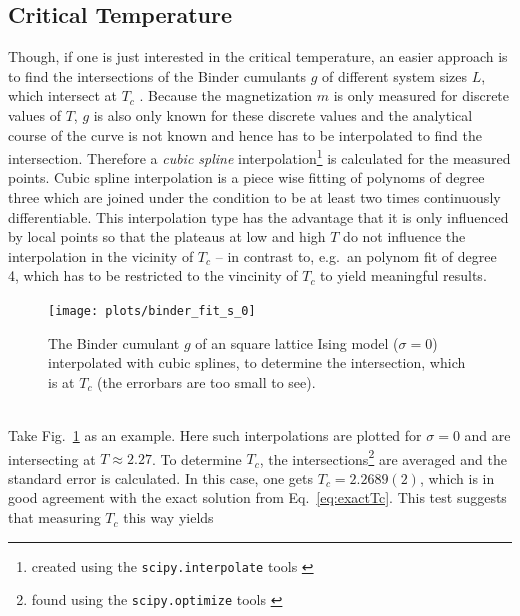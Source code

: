 \subsection{Critical Temperature}
\label{ssec:binderIntersections}
    Though, if one is just interested in the critical temperature, an
    easier approach is to find the intersections of the Binder cumulants
    \(g\) of different system sizes \(L\), which intersect at \(T_c\) \cite{Binder1981}.
    Because the magnetization \(m\) is only measured for discrete values
    of \(T\), \(g\) is also only known for these discrete values and the
    analytical course of the curve is not known and hence has
    to be interpolated to find the intersection. Therefore a \emph{cubic spline}
    interpolation\footnote{created using the \texttt{scipy.interpolate} tools \cite{scipy2001}}
    is calculated for the measured points.
    Cubic spline interpolation is a piece wise fitting of polynoms of
    degree three which are joined under the condition to be at least two
    times continuously differentiable. This interpolation type has the
    advantage that it is only influenced by local points so that the
    plateaus at low and high \(T\) do not influence the interpolation in
    the vicinity of \(T_c\) -- in contrast to, e.g.\ an polynom fit of
    degree 4, which has to be restricted to the vincinity of \(T_c\) to
    yield meaningful results.
    \begin{figure}[htbp]
        \centering
        \texttt{[image: plots/binder\_fit\_s\_0]}
        \caption[Example of a Binder Cumulant to Determine the Critical Temperature]
        {
            The Binder cumulant \(g\) of an square lattice Ising model
            (\(\sigma=0\)) interpolated with cubic splines, to determine
            the intersection, which is at \(T_c\)
            (the errorbars are too small to see).\\
        }
        \label{fig:gettingCrit:binder_fit_s_0}
    \end{figure}\\
    Take Fig.\ \ref{fig:gettingCrit:binder_fit_s_0} as an example.
    Here such interpolations are plotted for \(\sigma=0\) and are
    intersecting at \(T \approx 2.27\).
    To determine \(T_c\), the intersections\footnote{found using the \texttt{scipy.optimize} tools \cite{scipy2001}}
    are averaged and the standard error is calculated. In this case, one
    gets \(T_c = 2.2689(2)\), which is in good agreement with the
    exact solution from Eq.\ \eqref{eq:exactTc}.
    This test suggests that measuring \(T_c\) this way yields
